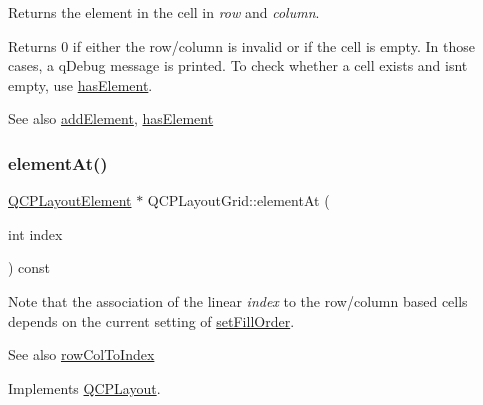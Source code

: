 Returns the element in the cell in {\itshape row} and {\itshape column}.

Returns 0 if either the row/column is invalid or if the cell is empty. In those cases, a q\+Debug message is printed. To check whether a cell exists and isn\textquotesingle{}t empty, use \hyperlink{class_q_c_p_layout_grid_ab0cf4f7edc9414a3bfaddac0f46dc0a0}{has\+Element}.

\begin{DoxySeeAlso}{See also}
\hyperlink{class_q_c_p_layout_grid_adff1a2ca691ed83d2d24a4cd1fe17012}{add\+Element}, \hyperlink{class_q_c_p_layout_grid_ab0cf4f7edc9414a3bfaddac0f46dc0a0}{has\+Element} 
\end{DoxySeeAlso}
\mbox{\label{class_q_c_p_layout_grid_a4288f174082555f6bd92021bdedb75dc}} 
\subsubsection{\texorpdfstring{element\+At()}{elementAt()}}
{\footnotesize\ttfamily \hyperlink{class_q_c_p_layout_element}{Q\+C\+P\+Layout\+Element} $\ast$ Q\+C\+P\+Layout\+Grid\+::element\+At (\begin{DoxyParamCaption}\item[{int}]{index }\end{DoxyParamCaption}) const\hspace{0.3cm}{\ttfamily [virtual]}}

Note that the association of the linear {\itshape index} to the row/column based cells depends on the current setting of \hyperlink{class_q_c_p_layout_grid_affc2f3cfd22f28698c5b29b960d2a391}{set\+Fill\+Order}.

\begin{DoxySeeAlso}{See also}
\hyperlink{class_q_c_p_layout_grid_a682ba76f130810ffd294032a1bfbcfcb}{row\+Col\+To\+Index} 
\end{DoxySeeAlso}


Implements \hyperlink{class_q_c_p_layout_afa73ca7d859f8a3ee5c73c9b353d2a56}{Q\+C\+P\+Layout}.

\mbox{\label{class_q_c_p_layout_grid_a9a8942aface780a02445ebcf14c48513}} 
